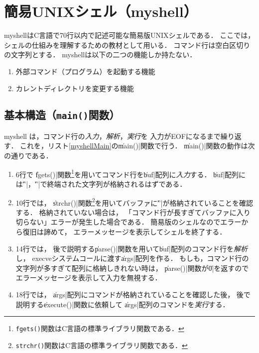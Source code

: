 \section{簡易UNIXシェル（myshell）}
myshellはC言語で70行以内で記述可能な簡易版UNIXシェルである．
ここでは，シェルの仕組みを理解するための教材として用いる．
コマンド行は空白区切りの文字列とする．
myshellは以下の二つの機能しか持たない．

\begin{enumerate}
\item 外部コマンド（プログラム）を起動する機能
\item カレントディレクトリを変更する機能
\end{enumerate}

\subsection{基本構造（\texttt{main()}関数）}
myshell は，コマンド行の\emph{入力}，\emph{解析}，\emph{実行}を
入力がEOFになるまで繰り返す．
これを，リスト\ref{myshellMain}の\|main()|関数で行う．
\|main()|関数の動作は次の通りである．



\begin{enumerate}
\item 6行で
  \|fgets()|関数\footnote{
    \texttt{fgets()}関数はC言語の標準ライブラリ関数である．
  }を用いてコマンド行を\|buf|配列に\emph{入力}する．
  \|buf|配列には\|'\n'|，\|'\0'|で終端された文字列が格納されるはずである．
\item 10行では，
  \|strchr()|関数\footnote{
    \texttt{strchr()}関数はC言語の標準ライブラリ関数である．
  }を用いてバッファに\|'\n'|が格納されていることを確認する．
  格納されていない場合は，
  「コマンド行が長すぎてバッファに入り切らない」エラーが発生した場合である．
  簡易版のシェルなのでエラーから復旧は諦めて，
  エラーメッセージを表示してシェルを終了する．
\item 14行では，
  後で説明する\|parse()|関数を用いて\|buf|配列のコマンド行を\emph{解析}し，
  execveシステムコールに渡す\|args|配列を作る．
  もしも，コマンド行の文字列が多すぎて配列に格納しきれない時は，
  \|parse()|関数が\|0|を返すのでエラーメッセージを表示して入力を無視する．
\item 18行では，
  \|args|配列にコマンドが格納されていることを確認した後，
  後で説明する\|execute()|関数に依頼して
  \|args|配列のコマンドを\emph{実行}する．
\end{enumerate}

